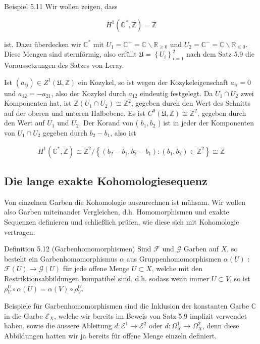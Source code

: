 \documentclass[10pt, letterpaper]{article}
\begin{document}
Beispiel 5.11 Wir wollen zeigen, dass

$$
H^{1}\left(\mathbb{C}^{*}, \mathbb{Z}\right)=\mathbb{Z}
$$

ist. Dazu überdecken wir $\mathbb{C}^{*}$ mit $U_{1}=\mathbb{C}^{+}=\mathbb{C} \backslash \mathbb{R}_{\geq 0}$ und $U_{2}=\mathbb{C}^{-}=\mathbb{C} \backslash \mathbb{R}_{\leq 0}$. Diese Mengen sind sternförmig, also erfüllt $\mathfrak{U}=\left\{U_{i}\right\}_{i=1}^{2}$ nach dem Satz 5.9 die Voraussetzungen des Satzes von Leray.

Ist $\left(a_{i j}\right) \in Z^{1}(\mathfrak{U}, \mathbb{Z})$ ein Kozykel, so ist wegen der Kozykeleigenschaft $a_{i i}=0$ und $a_{12}=-a_{21}$, also der Kozykel durch $a_{12}$ eindeutig festgelegt. Da $U_{1} \cap U_{2}$ zwei Komponenten hat, ist $\mathbb{Z}\left(U_{1} \cap U_{2}\right) \cong \mathbb{Z}^{2}$, gegeben durch den Wert des Schnitts auf der oberen und unteren Halbebene. Es ist $C^{0}(\mathfrak{U}, \mathbb{Z}) \cong \mathbb{Z}^{2}$, gegeben durch den Wert auf $U_{1}$ und $U_{2}$. Der Korand von ( $b_{1}, b_{2}$ ) ist in jeder der Komponenten von $U_{1} \cap U_{2}$ gegeben durch $b_{2}-b_{1}$, also ist

$$
H^{1}\left(\mathbb{C}^{*}, \mathbb{Z}\right) \cong \mathbb{Z}^{2} /\left\{\left(b_{2}-b_{1}, b_{2}-b_{1}\right):\left(b_{1}, b_{2}\right) \in \mathbb{Z}^{2}\right\} \cong \mathbb{Z}
$$

\subsection {Die lange exakte Kohomologiesequenz}
Von einzelnen Garben die Kohomologie auszurechnen ist mühsam. Wir wollen also Garben miteinander Vergleichen, d.h. Homomorphismen und exakte Sequenzen definieren und schließlich prüfen, wie diese sich mit Kohomologie vertragen.

Definition 5.12 (Garbenhomomorphismen) Sind $\mathcal{F}$ und $\mathcal{G}$ Garben auf $X$, so besteht ein Garbenhomomorphismus $\alpha$ aus Gruppenhomomorphismen $\alpha(U)$ : $\mathcal{F}(U) \rightarrow \mathcal{G}(U)$ für jede offene Menge $U \subset X$, welche mit den Restriktionsabbildungen kompatibel sind, d.h. sodass wenn immer $U \subset V$, so ist $\rho_{V}^{U} \circ \alpha(U)=\alpha(V) \circ \rho_{V}^{U}$.

Beispiele für Garbenhomomorphismen sind die Inklusion der konstanten Garbe $\mathbb{C}$ in die Garbe $\mathcal{E}_{X}$, welche wir bereits im Beweis von Satz 5.9 implizit verwendet haben, sowie die äussere Ableitung $d: \mathcal{E}^{1} \rightarrow \mathcal{E}^{2}$ oder $d: \Omega_{X}^{1} \rightarrow \Omega_{X}^{2}$, denn diese Abbildungen hatten wir ja bereits für offene Menge einzeln definiert.
\end{document}
